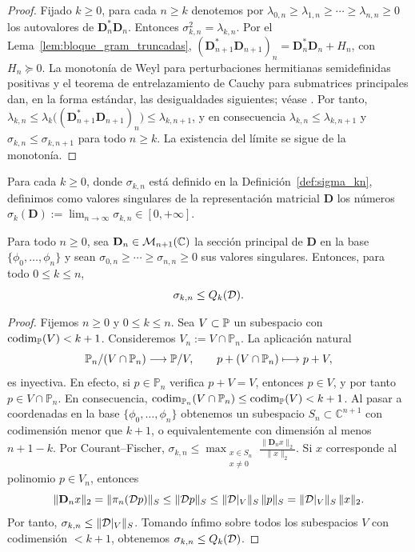 \begin{proof}
	Fijado \(k\ge0\), para cada \(n\ge k\) denotemos por \(\lambda_{0,n}\ge\lambda_{1,n}\ge\cdots\ge\lambda_{n,n}\ge0\) los autovalores de \(\mathbf D_n^*\mathbf D_n\). Entonces \(\sigma_{k,n}^2=\lambda_{k,n}\).
	Por el Lema~\ref{lem:bloque_gram_truncadas},
	\((\mathbf D_{n+1}^*\mathbf D_{n+1})_n=\mathbf D_n^*\mathbf D_n+H_n\), con \(H_n\succeq0\).
	La monotonía de Weyl para perturbaciones hermitianas semidefinidas positivas y el teorema de entrelazamiento de Cauchy para submatrices principales dan, en la forma estándar, las desigualdades siguientes; véase \cite[Chapter~4]{horn2012matrix}.
	Por tanto, \(\lambda_{k,n}\le\lambda_k\bigl((\mathbf D_{n+1}^*\mathbf D_{n+1})_n\bigr)\le\lambda_{k,n+1}\), y en consecuencia \(\lambda_{k,n}\le\lambda_{k,n+1}\) y \(\sigma_{k,n}\le\sigma_{k,n+1}\) para todo \(n\ge k\).
	La existencia del límite se sigue de la monotonía.
\end{proof}

\begin{defn}\label{def:sigma_operador}
	Para cada \(k\ge0\), donde \(\sigma_{k,n}\) está definido en la Definición~\ref{def:sigma_kn}, definimos como valores singulares de la representación matricial \(\mathbf D\) los números
	\(\sigma_k(\mathbf D):=\lim_{n\to\infty}\sigma_{k,n}\in[0,+\infty]\).
\end{defn}

\begin{prop}\label{prop:sigma_qk}
	Para todo \(n\ge0\), sea \(\mathbf D_n\in\mathcal M_{n+1}(\mathbb{C})\) la sección principal de \(\mathbf D\) en la base \(\{\phi_0,\dots,\phi_n\}\) y sean \(\sigma_{0,n}\ge\cdots\ge\sigma_{n,n}\ge0\) sus valores singulares. Entonces, para todo \(0\le k\le n\),
	\[
		\sigma_{k,n}\le Q_k(\mathcal{D}).
	\]
\end{prop}

\begin{proof}
	Fijemos $n\ge0$ y $0\le k\le n$. Sea $V\subset\mathbb{P}$ un subespacio con
	\(\operatorname{codim}_{\mathbb{P}}(V)<k+1\).
	Consideremos \(V_n:=V\cap\mathbb P_n\).
	La aplicación natural
	\[
		\mathbb P_n/(V\cap\mathbb P_n)\longrightarrow \mathbb{P}/V,
		\qquad
		p+(V\cap\mathbb P_n)\longmapsto p+V,
	\]
	es inyectiva. En efecto, si $p\in\mathbb P_n$ verifica $p+V=V$, entonces $p\in V$, y por tanto $p\in V\cap\mathbb P_n$.
	En consecuencia, \(\operatorname{codim}_{\mathbb P_n}(V\cap\mathbb P_n)\le\operatorname{codim}_{\mathbb{P}}(V)<k+1\).
	Al pasar a coordenadas en la base $\{\phi_0,\dots,\phi_n\}$ obtenemos un subespacio $S_n\subset\mathbb C^{n+1}$ con codimensión menor que $k+1$, o equivalentemente con dimensión al menos $n+1-k$. Por Courant--Fischer,
	\(\sigma_{k,n}\le\max_{\substack{x\in S_n\\x\neq0}}\frac{\|\mathbf D_nx\|_2}{\|x\|_2}\).
	Si $x$ corresponde al polinomio $p\in V_n$, entonces
	\[
		\|\mathbf D_nx\|_2=\|\pi_n(\mathcal{D} p)\|_S\le \|\mathcal{D} p\|_S\le \|\mathcal{D}|_V\|_S\,\|p\|_S=\|\mathcal{D}|_V\|_S\,\|x\|_2.
	\]
	Por tanto, \(\sigma_{k,n}\le \|\mathcal{D}|_V\|_S\).
	Tomando ínfimo sobre todos los subespacios $V$ con codimensión $<k+1$, obtenemos \(\sigma_{k,n}\le Q_k(\mathcal{D})\).
\end{proof}

